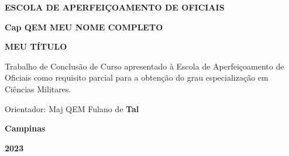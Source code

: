 \documentclass[12pt,a4paper]{article}
\def\mytitle{MEU TÍTULO}
\def\myname{Cap QEM MEU NOME COMPLETO}
\def\myadvisor{Maj QEM Fulano de \textbf{Tal}}
\begin{document}
\begin{titlepage}
    \centering
    \onehalfspacing
    \textbf{\Large ESCOLA DE APERFEIÇOAMENTO DE OFICIAIS} %

    \vspace{3\baselineskip} %

    \textbf{\myname} %

    \vspace{4\baselineskip} %

    \textbf{\mytitle} %

    \vspace{2\baselineskip} %


    \vspace{\baselineskip} %


    \vspace{4\baselineskip} %

    \begin{flushright}
    \begin{minipage}{0.5\textwidth}
        \singlespacing
        Trabalho de Conclusão de Curso apresentado à Escola de  Aperfeiçoamento de Oficiais como requisito parcial para a obtenção do grau especialização em Ciências Militares.

        \vspace{\baselineskip} %

         Orientador: \myadvisor %
    \end{minipage}
    \end{flushright}

    \vfill %

    \vspace{4cm} %

    \onehalfspacing
    \textbf{Campinas} %

    \vspace{\baselineskip} %

    \textbf{2023} %
\end{titlepage}

\newpage %
\end{document}
